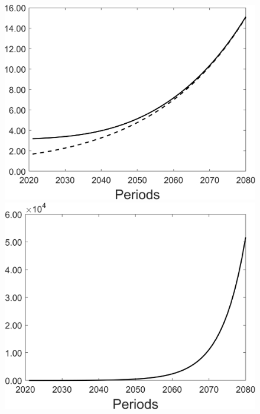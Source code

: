 \begin{figure}[h!!]
\begin{minipage}[]{0.32\textwidth}
\end{minipage}
\begin{minipage}[]{0.32\textwidth}
\includegraphics[width=1\textwidth]{../../codding_model/Own/figures/Rep_agent/staticBAU_LF_separate_pc_periods59_eppsilon4.00_zeta1.40_Ad08_Ac04_thetac0.70_thetad0.56_HetGrowth1_tauul0.181_util0_withtarget0_lgd0.png}
\end{minipage}
	\begin{minipage}[]{0.32\textwidth}
		\includegraphics[width=1\textwidth]{../../codding_model/Own/figures/Rep_agent/staticBAU_LF_separate_ydyc_periods59_eppsilon4.00_zeta1.40_Ad08_Ac04_thetac0.70_thetad0.56_HetGrowth1_tauul0.181_util0_withtarget0_lgd0.png}
	\end{minipage}
\end{figure}

